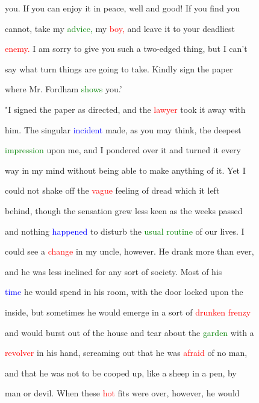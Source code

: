  you. If you can \textcolor{BurntOrange}{enjoy} it in \textcolor{BurntOrange}{peace,} well and \textcolor{BurntOrange}{good!} If you find you

 cannot, take my \textcolor{green}{advice,} my \textcolor{red}{boy,} and \textcolor{BurntOrange}{leave} it to your deadliest

 \textcolor{red}{enemy.} I am sorry to give you such a two-edged thing, but I can't

 say what turn things are going to take. Kindly sign the paper

 where Mr. Fordham \textcolor{green}{shows} you.'



 "I signed the paper as directed, and the \textcolor{red}{lawyer} took it away with

 him. The singular \textcolor{blue}{incident} made, as you may think, the deepest

 \textcolor{green}{impression} upon me, and I pondered over it and turned it every

 way in my mind without being able to make anything of it. Yet I

 could not shake off the \textcolor{red}{vague} feeling of \textcolor{BurntOrange}{dread} which it left

 behind, though the sensation \textcolor{BurntOrange}{grew} less keen as the weeks passed

 and nothing \textcolor{blue}{happened} to disturb the \textcolor{green}{usual} \textcolor{green}{routine} of our lives. I

 could see a \textcolor{red}{change} in my uncle, however. He drank more than ever,

 and he was less inclined for any sort of society. Most of his

 \textcolor{blue}{time} he would spend in his room, with the door locked upon the

 inside, but sometimes he would emerge in a sort of \textcolor{red}{drunken} \textcolor{red}{frenzy}

 and would burst out of the house and tear about the \textcolor{green}{garden} with a

 \textcolor{red}{revolver} in his hand, \textcolor{BurntOrange}{screaming} out that he was \textcolor{red}{afraid} of no man,

 and that he was not to be cooped up, like a sheep in a pen, by

 man or \textcolor{BurntOrange}{devil.} When these \textcolor{red}{hot} fits were over, however, he would

